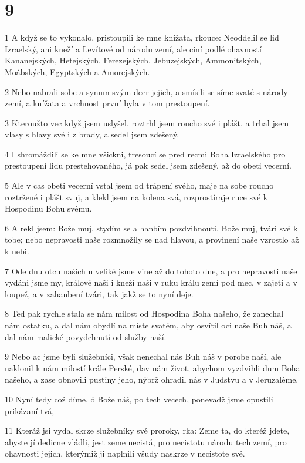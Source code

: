 \chapter{9}

\par 1 A když se to vykonalo, pristoupili ke mne knížata, rkouce: Neoddelil se lid Izraelský, ani kneží a Levítové od národu zemí, ale ciní podlé ohavností Kananejských, Hetejských, Ferezejských, Jebuzejských, Ammonitských, Moábských, Egyptských a Amorejských.
\par 2 Nebo nabrali sobe a synum svým dcer jejich, a smísili se síme svaté s národy zemí, a knížata a vrchnost první byla v tom prestoupení.
\par 3 Kteroužto vec když jsem uslyšel, roztrhl jsem roucho své i plášt, a trhal jsem vlasy s hlavy své i z brady, a sedel jsem zdešený.
\par 4 I shromáždili se ke mne všickni, tresoucí se pred recmi Boha Izraelského pro prestoupení lidu prestehovaného, já pak sedel jsem zdešený, až do obeti vecerní.
\par 5 Ale v cas obeti vecerní vstal jsem od trápení svého, maje na sobe roucho roztržené i plášt svuj, a klekl jsem na kolena svá, rozprostíraje ruce své k Hospodinu Bohu svému.
\par 6 A rekl jsem: Bože muj, stydím se a hanbím pozdvihnouti, Bože muj, tvári své k tobe; nebo nepravosti naše rozmnožily se nad hlavou, a provinení naše vzrostlo až k nebi.
\par 7 Ode dnu otcu našich u veliké jsme vine až do tohoto dne, a pro nepravosti naše vydáni jsme my, králové naši i kneží naši v ruku králu zemí pod mec, v zajetí a v loupež, a v zahanbení tvári, tak jakž se to nyní deje.
\par 8 Ted pak rychle stala se nám milost od Hospodina Boha našeho, že zanechal nám ostatku, a dal nám obydlí na míste svatém, aby osvítil oci naše Buh náš, a dal nám malické povydchnutí od služby naší.
\par 9 Nebo ac jsme byli služebníci, však nenechal nás Buh náš v porobe naší, ale naklonil k nám milostí krále Perské, dav nám život, abychom vyzdvihli dum Boha našeho, a zase obnovili pustiny jeho, nýbrž ohradil nás v Judstvu a v Jeruzaléme.
\par 10 Nyní tedy což díme, ó Bože náš, po tech vecech, ponevadž jsme opustili prikázaní tvá,
\par 11 Kteráž jsi vydal skrze služebníky své proroky, rka: Zeme ta, do kteréž jdete, abyste jí dedicne vládli, jest zeme necistá, pro necistotu národu tech zemí, pro ohavnosti jejich, kterýmiž ji naplnili všudy naskrze v necistote své.
